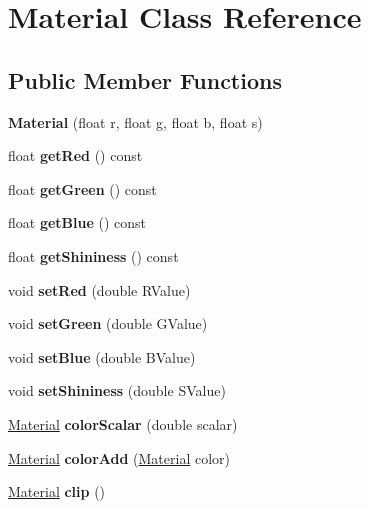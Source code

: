 \hypertarget{class_material}{}\section{Material Class Reference}
\label{class_material}
\subsection*{Public Member Functions}
\begin{DoxyCompactItemize}
\item 
\mbox{\label{class_material_ac8d5054ec7d38ef126591219a291999f}} 
{\bfseries Material} (float r, float g, float b, float s)
\item 
\mbox{\label{class_material_aa0ebce03213f42c962d7c60fdab787a8}} 
float {\bfseries get\+Red} () const
\item 
\mbox{\label{class_material_a4728d9ed4f2b6cd9c8f3096c68617f1b}} 
float {\bfseries get\+Green} () const
\item 
\mbox{\label{class_material_aaac3b6e4848d1ced045d9790f89a8084}} 
float {\bfseries get\+Blue} () const
\item 
\mbox{\label{class_material_ac65754d70c261b6065087fe3ce828872}} 
float {\bfseries get\+Shininess} () const
\item 
\mbox{\label{class_material_aa46b0d1d5557e3c86396aa9a65e7314e}} 
void {\bfseries set\+Red} (double R\+Value)
\item 
\mbox{\label{class_material_a6bf2a435ca0ace3a9b119e4f9e351e29}} 
void {\bfseries set\+Green} (double G\+Value)
\item 
\mbox{\label{class_material_acb2577139eceee571387d00f6ef0ca57}} 
void {\bfseries set\+Blue} (double B\+Value)
\item 
\mbox{\label{class_material_a029df1bddd0d3c53bf76ad7594d0248e}} 
void {\bfseries set\+Shininess} (double S\+Value)
\item 
\mbox{\label{class_material_a1e67e8e0621864187926176e1c08ad5c}} 
\mbox{\hyperlink{class_material}{Material}} {\bfseries color\+Scalar} (double scalar)
\item 
\mbox{\label{class_material_af35f9928158d8c75088fa1e43da0c5ae}} 
\mbox{\hyperlink{class_material}{Material}} {\bfseries color\+Add} (\mbox{\hyperlink{class_material}{Material}} color)
\item 
\mbox{\label{class_material_a4c78a31f45d9512bd179e37c833c45b4}} 
\mbox{\hyperlink{class_material}{Material}} {\bfseries clip} ()
\end{DoxyCompactItemize}


